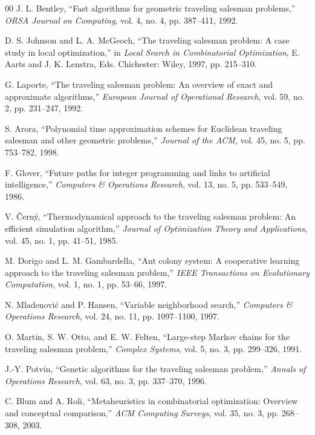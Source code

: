\begin{thebibliography}{00}
 J. L. Bentley,
``Fast algorithms for geometric traveling salesman problems,''
\textit{ORSA Journal on Computing}, vol. 4, no. 4, pp. 387--411, 1992.

 D. S. Johnson and L. A. McGeoch,
``The traveling salesman problem: A case study in local optimization,''
in \textit{Local Search in Combinatorial Optimization}, E. Aarts and J. K. Lenstra, Eds.
Chichester: Wiley, 1997, pp. 215--310.

 G. Laporte,
``The traveling salesman problem: An overview of exact and approximate algorithms,''
\textit{European Journal of Operational Research}, vol. 59, no. 2, pp. 231--247, 1992.

 S. Arora,
``Polynomial time approximation schemes for Euclidean traveling salesman and other geometric problems,''
\textit{Journal of the ACM}, vol. 45, no. 5, pp. 753--782, 1998.

 F. Glover,
``Future paths for integer programming and links to artificial intelligence,''
\textit{Computers \& Operations Research}, vol. 13, no. 5, pp. 533--549, 1986.

 V. \v{C}ern\'y,
``Thermodynamical approach to the traveling salesman problem: An efficient simulation algorithm,''
\textit{Journal of Optimization Theory and Applications}, vol. 45, no. 1, pp. 41--51, 1985.

 M. Dorigo and L. M. Gambardella,
``Ant colony system: A cooperative learning approach to the traveling salesman problem,''
\textit{IEEE Transactions on Evolutionary Computation}, vol. 1, no. 1, pp. 53--66, 1997.

 N. Mladenovi\'c and P. Hansen,
``Variable neighborhood search,''
\textit{Computers \& Operations Research}, vol. 24, no. 11, pp. 1097--1100, 1997.

 O. Martin, S. W. Otto, and E. W. Felten,
``Large-step Markov chains for the traveling salesman problem,''
\textit{Complex Systems}, vol. 5, no. 3, pp. 299--326, 1991.

 J.-Y. Potvin,
``Genetic algorithms for the traveling salesman problem,''
\textit{Annals of Operations Research}, vol. 63, no. 3, pp. 337--370, 1996.

 C. Blum and A. Roli,
``Metaheuristics in combinatorial optimization: Overview and conceptual comparison,''
\textit{ACM Computing Surveys}, vol. 35, no. 3, pp. 268--308, 2003.


\end{thebibliography}
